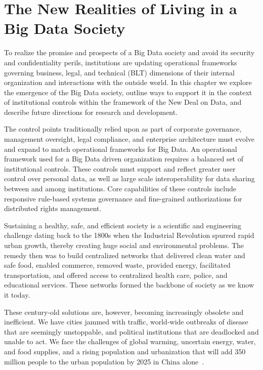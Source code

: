 \section{The New Realities of Living in a Big Data Society}

To realize the promise and prospects of a Big Data society and avoid its security and confidentiality perils, institutions are updating operational frameworks governing business, legal, and technical (BLT) dimensions of their internal organization and interactions with the outside world.
In this chapter we explore the emergence of the Big Data society, outline ways to support it in the context of institutional controls within the framework of the New Deal on Data, and describe future directions for research and development.

The control points traditionally relied upon as part of corporate governance, management oversight, legal compliance, and enterprise architecture must evolve and expand to match operational frameworks for Big Data.
An operational framework used for a Big Data driven organization requires a balanced set of institutional controls.
These controls must support and reflect greater user control over personal data, as well as large scale interoperability for data sharing between and among institutions.
Core capabilities of these controls include responsive rule-based systems governance and fine-grained authorizations for distributed rights management.

Sustaining a healthy, safe, and efficient society is a scientific and engineering challenge dating back to the 1800s when the Industrial Revolution spurred rapid urban growth, thereby creating huge social and environmental problems.
The remedy then was to build centralized networks that delivered clean water and safe food, enabled commerce, removed waste, provided energy, facilitated transportation, and offered access to centralized health care, police, and educational services.
These networks formed the backbone of society as we know it today.

These century-old solutions are, however, becoming increasingly obsolete and inefficient.
We have cities jammed with traffic, world-wide outbreaks of disease that are seemingly unstoppable, and political institutions that are deadlocked and unable to act.
We face the challenges of global warming, uncertain energy, water, and food supplies, and a rising population and urbanization that will add 350 million people to the urban population by 2025 in China alone~\cite{cities2009}.


